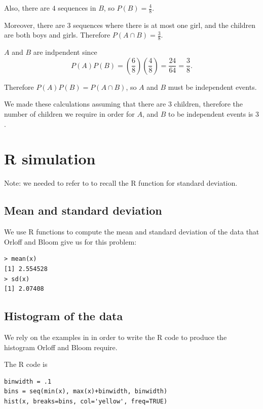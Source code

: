 \documentclass[a4paper,11pt]{article}
\begin{document}
Also, there are $4$ sequences in $B$, so $P\left( B \right) = \frac{4}{8}$.

Moreover, there are $3$ sequences where there is at most one girl, and
the children are both boys and girls.  Therefore $P\left( A \cap B \right) = \frac{3}{8}$.

$A$ and $B$ are indpendent since
\begin{equation}
P\left(A \right) P \left( B \right)
  = \left( \frac{6}{8} \right) \left( \frac{4}{8} \right)
  = \frac{24}{64} = \frac{3}{8}.
\end{equation}

Therefore $P\left(A \right) P\left(B \right) = P \left(A \cap B \right)$,
so $A$ and $B$ must be independent events.

We made these calculations assuming that there are $3$ children,
therefore the number of children we require in order for $A$, and
$B$ to be independent events is $3$.

\section{R simulation}

Note: we needed to refer to \cite{rStandardDev} to recall the R function for
standard deviation.

\subsection{Mean and standard deviation}

We use R functions to compute the mean and standard deviation of the data
that Orloff and Bloom give us for this problem:

\begin{lstlisting}
> mean(x)
[1] 2.554528
> sd(x)
[1] 2.07408
\end{lstlisting}

\subsection{Histogram of the data}

We rely on the examples in \cite{studio3} in order to write the R code to
produce the histogram Orloff and Bloom require.

The R code is
\begin{lstlisting}
binwidth = .1
bins = seq(min(x), max(x)+binwidth, binwidth)
hist(x, breaks=bins, col='yellow', freq=TRUE)
\end{lstlisting}
\end{document}
